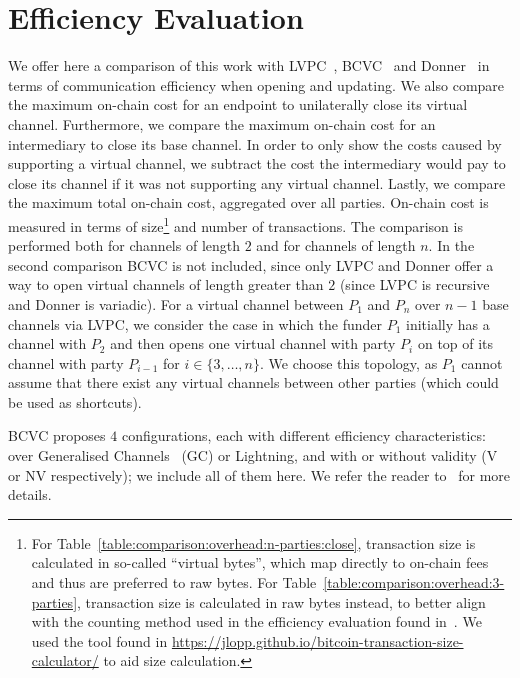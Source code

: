 \section{Efficiency Evaluation}
  \label{section:comparison}
  We offer here a comparison of this work with
  LVPC~\cite{10.1007/978-3-030-65411-5_18}, BCVC~\cite{cryptoeprint:2020:554}
  and Donner~\cite{donner} in terms of communication efficiency when opening and
  updating. We also compare
  the maximum on-chain cost for an endpoint to unilaterally close its virtual
  channel. Furthermore, we compare the maximum on-chain cost for an intermediary
  to close its base channel. In order to only show the costs caused by
  supporting a virtual channel, we subtract the cost the intermediary would pay
  to close its channel if it was not supporting any virtual channel. Lastly, we
  compare the maximum total on-chain cost, aggregated over all parties. On-chain
  cost is measured in terms of size\footnote{For
  Table~\ref{table:comparison:overhead:n-parties:close}, transaction size is
  calculated in
  so-called ``virtual bytes'', which map directly to on-chain fees and thus are
  preferred to raw bytes. For Table~\ref{table:comparison:overhead:3-parties},
  transaction size is calculated in raw bytes instead, to better align with the
  counting method used in the efficiency evaluation found
  in~\cite{cryptoeprint:2020:554}. We used the tool found in
  \url{https://jlopp.github.io/bitcoin-transaction-size-calculator/} to aid size
  calculation.} and number of transactions. The comparison is performed both for
  channels of length $2$ and for channels of length $n$. In the second
  comparison BCVC is not included, since only LVPC and Donner offer a way to
  open virtual channels of length greater than $2$ (since LVPC is recursive and
  Donner is variadic). For a virtual channel between $P_1$ and $P_n$ over $n-1$
  base channels via LVPC, we consider the case in which the funder $P_1$
  initially has a channel with $P_2$ and then opens one virtual channel with
  party $P_i$ on top of its channel with party $P_{i-1}$ for $i \in \{3, \dots,
  n\}$. We choose this topology, as $P_1$ cannot assume that there exist any
  virtual channels between other parties (which could be used as shortcuts).

  BCVC proposes $4$ configurations, each with different efficiency
  characteristics: over Generalised Channels~\cite{cryptoeprint:2020:476} (GC)
  or Lightning, and with or without validity (V or NV respectively); we include
  all of them here. We refer the reader to~\cite{cryptoeprint:2020:554} for more
  details.

